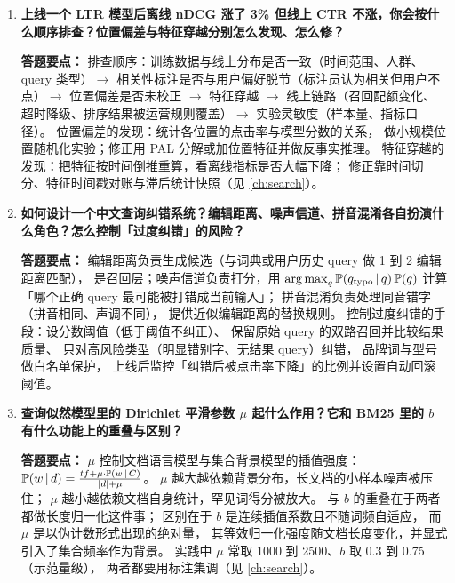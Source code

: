 \begin{interview}[题库与答题要点]
\begin{enumerate}[label=]
  \item[\textcolor{VioletDeep}{\textbf{Q40.}}] \textbf{上线一个 LTR 模型后离线 nDCG 涨了 3\% 但线上 CTR 不涨，你会按什么顺序排查？位置偏差与特征穿越分别怎么发现、怎么修？}
\par\smallskip\noindent\textcolor{VioletDeep}{\textbf{答题要点：}}
排查顺序：训练数据与线上分布是否一致（时间范围、人群、query 类型）$\to$
相关性标注是否与用户偏好脱节（标注员认为相关但用户不点）$\to$
位置偏差是否未校正 $\to$ 特征穿越 $\to$
线上链路（召回配额变化、超时降级、排序结果被运营规则覆盖）$\to$
实验灵敏度（样本量、指标口径）。
位置偏差的发现：统计各位置的点击率与模型分数的关系，
做小规模位置随机化实验；修正用 PAL 分解或加位置特征并做反事实推理。
特征穿越的发现：把特征按时间倒推重算，看离线指标是否大幅下降；
修正靠时间切分、特征时间戳对账与滞后统计快照（见 \cref{ch:search}）。

  \item[\textcolor{VioletDeep}{\textbf{Q41.}}] \textbf{如何设计一个中文查询纠错系统？编辑距离、噪声信道、拼音混淆各自扮演什么角色？怎么控制「过度纠错」的风险？}
\par\smallskip\noindent\textcolor{VioletDeep}{\textbf{答题要点：}}
编辑距离负责生成候选（与词典或用户历史 query 做 1 到 2 编辑距离匹配），
是召回层；噪声信道负责打分，用 $\operatorname*{arg\,max}_q \operatorname{\mathbb{P}}(q_{\text{typo}}\,\vert\, q)\operatorname{\mathbb{P}}(q)$
计算「哪个正确 query 最可能被打错成当前输入」；
拼音混淆负责处理同音错字（拼音相同、声调不同），
提供近似编辑距离的替换规则。
控制过度纠错的手段：设分数阈值（低于阈值不纠正）、
保留原始 query 的双路召回并比较结果质量、
只对高风险类型（明显错别字、无结果 query）纠错，
品牌词与型号做白名单保护，
上线后监控「纠错后被点击率下降」的比例并设置自动回滚阈值。

  \item[\textcolor{VioletDeep}{\textbf{Q42.}}] \textbf{查询似然模型里的 Dirichlet 平滑参数 $\mu$ 起什么作用？它和 BM25 里的 $b$ 有什么功能上的重叠与区别？}
\par\smallskip\noindent\textcolor{VioletDeep}{\textbf{答题要点：}}
$\mu$ 控制文档语言模型与集合背景模型的插值强度：
$\operatorname{\mathbb{P}}(w\,\vert\, d) = \frac{tf + \mu \cdot \operatorname{\mathbb{P}}(w\,\vert\, C)}{\left\lvert d \right\rvert + \mu}$。
$\mu$ 越大越依赖背景分布，长文档的小样本噪声被压住；
$\mu$ 越小越依赖文档自身统计，罕见词得分被放大。
与 $b$ 的重叠在于两者都做长度归一化这件事；
区别在于 $b$ 是连续插值系数且不随词频自适应，
而 $\mu$ 是以伪计数形式出现的绝对量，
其等效归一化强度随文档长度变化，并显式引入了集合频率作为背景。
实践中 $\mu$ 常取 1000 到 2500、$b$ 取 0.3 到 0.75（示范量级），
两者都要用标注集调（见 \cref{ch:search}）。


\end{enumerate}
\end{interview}
